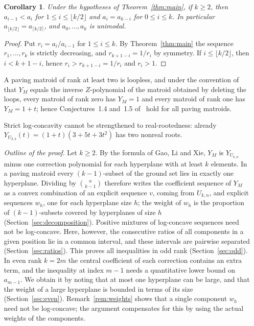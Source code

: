 \documentclass[11pt]{amsart}
\newtheorem{corollary}[theorem]{Corollary}
\theoremstyle{definition}
\theoremstyle{remark}
\numberwithin{equation}{section}
\begin{document}
\begin{corollary}\label{cor:unimodal}
Under the hypotheses of Theorem~\ref{thm:main}, if $k\ge2$, then $a_{i-1}<a_i$ for $1\le i\le\lfloor k/2\rfloor$ and $a_i=a_{k-i}$ for $0\le i\le k$. In particular $a_{\lfloor k/2\rfloor}=a_{\lceil k/2\rceil}$, and $a_0,\dots,a_k$ is unimodal.
\end{corollary}

\begin{proof}
Put $r_i=a_i/a_{i-1}$ for $1\le i\le k$. By Theorem~\ref{thm:main} the sequence $r_1,\dots,r_k$ is strictly decreasing, and $r_{k+1-i}=1/r_i$ by symmetry. If $i\le\lfloor k/2\rfloor$, then $i<k+1-i$, hence $r_i>r_{k+1-i}=1/r_i$ and $r_i>1$.
\end{proof}

A paving matroid of rank at least two is loopless, and under the convention of~\cite{GRX} that $Y_M$ equals the inverse $Z$-polynomial of the matroid obtained by deleting the loops, every matroid of rank zero has $Y_M=1$ and every matroid of rank one has $Y_M=1+t$; hence Conjectures~1.4 and~1.5 of~\cite{GRX} hold for all paving matroids.

Strict log-concavity cannot be strengthened to real-rootedness: already $Y_{U_{3,4}}(t)=(1+t)(3+5t+3t^2)$ has two nonreal roots.

\emph{Outline of the proof.} Let $k\ge2$. By the formula of Gao, Li and Xie, $Y_M$ is $Y_{U_{k,n}}$ minus one correction polynomial for each hyperplane with at least $k$ elements. In a paving matroid every $(k-1)$-subset of the ground set lies in exactly one hyperplane. Dividing by $\binom n{k-1}$ therefore writes the coefficient sequence of $Y_M$ as a convex combination of an explicit sequence $v$, coming from $U_{k,n}$, and explicit sequences $w_h$, one for each hyperplane size $h$; the weight of $w_h$ is the proportion of $(k-1)$-subsets covered by hyperplanes of size $h$ (Section~\ref{sec:decomposition}). Positive mixtures of log-concave sequences need not be log-concave. Here, however, the consecutive ratios of all components in a given position lie in a common interval, and these intervals are pairwise separated (Section~\ref{sec:ratios}). This proves all inequalities in odd rank (Section~\ref{sec:odd}). In even rank $k=2m$ the central coefficient of each correction contains an extra term, and the inequality at index $m-1$ needs a quantitative lower bound on $a_{m-1}$. We obtain it by noting that at most one hyperplane can be large, and that the weight of a large hyperplane is bounded in terms of its size (Section~\ref{sec:even}). Remark~\ref{rem:weights} shows that a single component $w_h$ need not be log-concave; the argument compensates for this by using the actual weights of the components.
\end{document}
